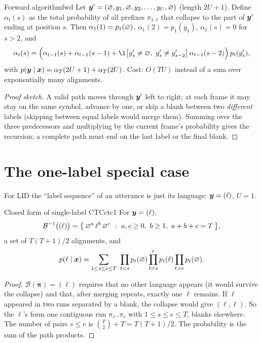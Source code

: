 \begin{theorem}{Forward algorithm}{fwd}
Let $\bm{y}'=(\varnothing,y_1,\varnothing,y_2,\dots,y_U,\varnothing)$ (length $2U+1$). Define $\alpha_t(s)$ as the total probability of all prefixes
$\pi_{1..t}$ that collapse to the part of $\bm{y}'$ ending at position $s$. Then $\alpha_1(1)=p_1(\varnothing)$, $\alpha_1(2)=p_1(y_1)$,
$\alpha_1(s)=0$ for $s>2$, and
\[
\alpha_t(s)=\Big(\alpha_{t-1}(s)+\alpha_{t-1}(s-1)+\1\big[y'_s\ne\blank,\ y'_s\ne y'_{s-2}\big]\,\alpha_{t-1}(s-2)\Big)\,p_t(y'_s),
\]
with $p(\bm{y}\mid\bm{x})=\alpha_T(2U+1)+\alpha_T(2U)$. Cost: $O(TU)$ instead of a sum over exponentially many alignments.
\end{theorem}
\begin{proof}[Proof sketch]
A valid path moves through $\bm{y}'$ left to right; at each frame it may stay on the same symbol, advance by one, or skip a blank
between two \emph{different} labels (skipping between equal labels would merge them). Summing over the three predecessors and
multiplying by the current frame's probability gives the recursion; a complete path must end on the last label or the final blank.
\end{proof}

\section{The one-label special case}

For LID the ``label sequence'' of an utterance is just its language: $\bm{y}=(\ell)$, $U=1$.

\begin{proposition}{Closed form of single-label CTC}{ctc1}
For $\bm{y}=(\ell)$,
\[
\mathcal B^{-1}\big((\ell)\big)=\big\{\,\blank^{a}\,\ell^{b}\,\blank^{c}\ :\ a,c\ge0,\ b\ge1,\ a+b+c=T\,\big\},
\]
a set of $T(T+1)/2$ alignments, and
\[
p(\ell\mid\vx)=\sum_{1\le s\le e\le T}\ \prod_{t<s}p_t(\blank)\prod_{t=s}^{e}p_t(\ell)\prod_{t>e}p_t(\blank).
\]
\end{proposition}
\begin{proof}
$\mathcal B(\bm\pi)=(\ell)$ requires that no other language appears (it would survive the collapse) and that, after merging repeats,
exactly one $\ell$ remains. If $\ell$ appeared in two runs separated by a blank, the collapse would give $(\ell,\ell)$. So the $\ell$'s
form one contiguous run $\pi_s..\pi_e$ with $1\le s\le e\le T$, blanks elsewhere. The number of pairs $s\le e$ is $\binom T2+T=T(T+1)/2$.
The probability is the sum of the path products.
\end{proof}

